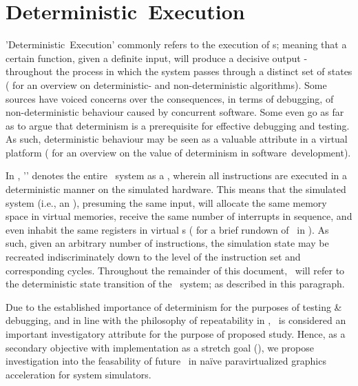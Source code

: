 \section{Deterministic~Execution}
\label{sec:researchquestions_deterministicexecution}
'Deterministic~Execution' commonly refers to the execution of \termdetalg s; meaning that a certain function, given a definite input, will produce a decisive output - throughout the process in which the system passes through a distinct set of states ( for an overview on deterministic- and non-deterministic algorithms).
Some sources have voiced concerns over the consequences, in terms of debugging, of non-deterministic behaviour caused by concurrent software.
Some even go as far as to argue that determinism is a prerequisite for effective debugging and testing.
As such, deterministic behaviour may be seen as a valuable attribute in a virtual platform ( for an overview on the value of determinism in software~development).

In \termsimics , '\termdetexe ' denotes the entire \termtarget\ system as a \termdetalg , wherein all instructions are executed in a deterministic manner on the simulated hardware.
This means that the simulated system (i.e., an \termos ), presuming the same input, will allocate the same memory space in virtual memories, receive the same number of interrupts in sequence, and even inhabit the same registers in virtual \termcpu s ( for a brief rundown of \termdetexe\ in \termsimics ).
As such, given an arbitrary number of instructions, the simulation state may be recreated indiscriminately down to the level of the instruction set and corresponding cycles.
Throughout the remainder of this document, \termdetexe\ will refer to the deterministic state transition of the \termtarget\ system; as described in this paragraph.

Due to the established importance of determinism for the purposes of testing \& debugging, and in line with the philosophy of repeatability in \termsimics {}, \termdetexe\ is considered an important investigatory attribute for the purpose of proposed study.
Hence, as a secondary objective with implementation as a stretch goal (), we propose investigation into the feasability of future \termdetexe\ in naïve paravirtualized graphics acceleration for system simulators.


